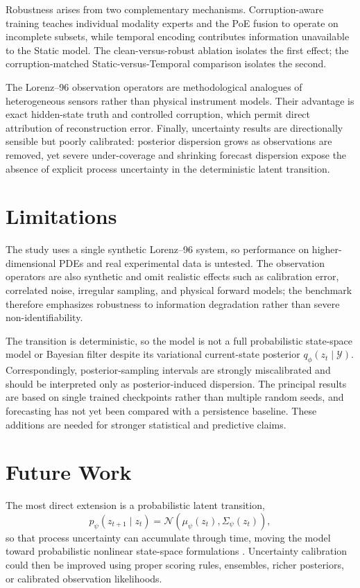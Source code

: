 \documentclass[10pt,twocolumn]{article}
\begin{document}
Robustness arises from two complementary mechanisms. Corruption-aware training teaches individual modality experts and the PoE fusion to operate on incomplete subsets, while temporal encoding contributes information unavailable to the Static model. The clean-versus-robust ablation isolates the first effect; the corruption-matched Static-versus-Temporal comparison isolates the second.

The Lorenz--96 observation operators are methodological analogues of heterogeneous sensors rather than physical instrument models. Their advantage is exact hidden-state truth and controlled corruption, which permit direct attribution of reconstruction error. Finally, uncertainty results are directionally sensible but poorly calibrated: posterior dispersion grows as observations are removed, yet severe under-coverage and shrinking forecast dispersion expose the absence of explicit process uncertainty in the deterministic latent transition.

\section{Limitations}
The study uses a single synthetic Lorenz--96 system, so performance on higher-dimensional PDEs and real experimental data is untested. The observation operators are also synthetic and omit realistic effects such as calibration error, correlated noise, irregular sampling, and physical forward models; the benchmark therefore emphasizes robustness to information degradation rather than severe non-identifiability.

The transition is deterministic, so the model is not a full probabilistic state-space model or Bayesian filter despite its variational current-state posterior $q_{\phi}(z_t\mid\mathcal{Y})$. Correspondingly, posterior-sampling intervals are strongly miscalibrated and should be interpreted only as posterior-induced dispersion. The principal results are based on single trained checkpoints rather than multiple random seeds, and forecasting has not yet been compared with a persistence baseline. These additions are needed for stronger statistical and predictive claims.

\section{Future Work}
The most direct extension is a probabilistic latent transition,
\begin{equation}
p_{\psi}(z_{t+1}\mid z_t)=\mathcal{N}\!\left(\mu_{\psi}(z_t),\Sigma_{\psi}(z_t)\right),
\end{equation}
so that process uncertainty can accumulate through time, moving the model toward probabilistic nonlinear state-space formulations \citep{krishnan2017structured,tan2020factorized}. Uncertainty calibration could then be improved using proper scoring rules, ensembles, richer posteriors, or calibrated observation likelihoods.
\end{document}

